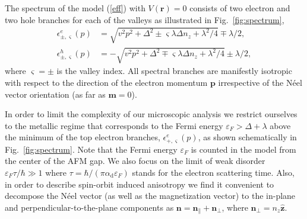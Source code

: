 \documentclass[%
  twocolumn,
  aps,
  prb,
  amsmath,
  amssymb,
  superscriptaddress,
  nofootinbib,
  floatfix
]{revtex4-1}
\newcommand{\beml}{\begin{subequations}}
\newcommand{\eml}{\end{subequations}}
\newcommand{\ep}{\varepsilon}
\newcommand{\bb}{\boldsymbol}
\newcommand{\0}{^{\phantom{\dagger}}}
\begin{document}
The spectrum of the model (\ref{eff}) with $V(\bb{r})=0$ consists of two electron and two hole branches for each of the valleys as illustrated in Fig.~\ref{fig:spectrum},
\beml
\label{spectrum}
\begin{align}
\label{spectrume}
\epsilon^e_{\pm,\varsigma}(p)&=\sqrt{v^2p^2+\Delta^2\pm \varsigma\lambda\Delta n_z+\lambda^2/4} \mp \lambda/2,\\
\epsilon^h_{\pm,\varsigma}(p)&=-\sqrt{v^2p^2+\Delta^2\mp \varsigma\lambda\Delta n_z+\lambda^2/4} \pm \lambda/2,
\end{align}
\eml
where $\varsigma=\pm$ is the valley index. All spectral branches are manifestly isotropic with respect to the direction of the electron momentum $\bb{p}$ irrespective of the N\'eel vector orientation (as far as $\bb{m}=0$). 

In order to limit the complexity of our microscopic analysis we restrict ourselves to the metallic regime that corresponds to the Fermi energy $\ep_F > \Delta+\lambda$ above the minimum of the top electron branches, $\epsilon^e_{+,\varsigma}(p)$, as shown schematically in Fig.~\ref{fig:spectrum}. Note that the Fermi energy $\ep_F$ is counted in the model from the center of the AFM gap. 
We also focus on the limit of weak disorder $\ep_F \tau/\hbar\gg 1$ where $\tau = \hbar/(\pi\alpha_\textrm{d}\ep_F)$ stands for the electron scattering time. Also, in order to describe spin-orbit induced anisotropy we find it convenient to decompose the N\'eel vector (as well as the magnetization vector) to the in-plane and perpendicular-to-the-plane components as $\bb{n}= \bb{n}_\parallel+\bb{n}_\perp$, where $\bb{n}_\perp=n_z\hat{\bb{z}}$. 
\end{document}
